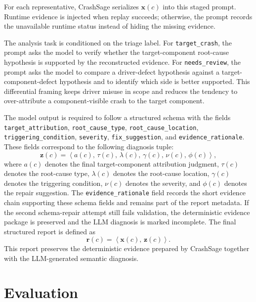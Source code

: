 \documentclass[pdflatex,sn-basic]{sn-jnl}%
\theoremstyle{thmstyleone}%
\theoremstyle{thmstyletwo}%
\theoremstyle{thmstylethree}%
\begin{document}
For each representative, CrashSage serializes \(\mathbf{x}(c)\) into this staged prompt.
Runtime evidence is injected when replay succeeds; otherwise, the prompt records the unavailable runtime status instead of hiding the missing evidence.

The analysis task is conditioned on the triage label.
For \texttt{target\_crash}, the prompt asks the model to verify whether the target-component root-cause hypothesis is supported by the reconstructed evidence.
For \texttt{needs\_review}, the prompt asks the model to compare a driver-defect hypothesis against a target-component-defect hypothesis and to identify which side is better supported.
This differential framing keeps driver misuse in scope and reduces the tendency to over-attribute a component-visible crash to the target component.

The model output is required to follow a structured schema with the fields \texttt{target\_attribution}, \texttt{root\_cause\_type}, \texttt{root\_cause\_location}, \texttt{triggering\_condition}, \texttt{severity}, \texttt{fix\_suggestion}, and \texttt{evidence\_rationale}.
These fields correspond to the following diagnosis tuple:
\begin{equation}
\mathbf{z}(c)=
\left\langle
a(c),\,\tau(c),\,\lambda(c),\,\gamma(c),\,\nu(c),\,\phi(c)
\right\rangle ,
\end{equation}
where \(a(c)\) denotes the final target-component attribution judgment, \(\tau(c)\) denotes the root-cause type, \(\lambda(c)\) denotes the root-cause location, \(\gamma(c)\) denotes the triggering condition, \(\nu(c)\) denotes the severity, and \(\phi(c)\) denotes the repair suggestion.
The \texttt{evidence\_rationale} field records the short evidence chain supporting these schema fields and remains part of the report metadata.
If the second schema-repair attempt still fails validation, the deterministic evidence package is preserved and the LLM diagnosis is marked incomplete.
The final structured report is defined as
\begin{equation}
\mathbf{r}(c)=
\left\langle
\mathbf{x}(c),\,\mathbf{z}(c)
\right\rangle .
\end{equation}
This report preserves the deterministic evidence prepared by CrashSage together with the LLM-generated semantic diagnosis.



\section{Evaluation}
\label{sec:evaluation}
\end{document}
